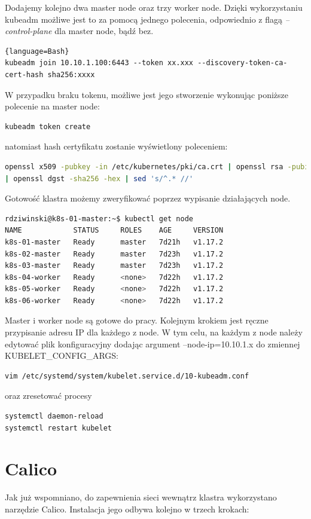 \documentclass[pl,final,oneside]{mgr} %
\begin{document}
Dodajemy kolejno dwa master node oraz trzy worker node. Dzięki wykorzystaniu kubeadm możliwe jest to za pomocą jednego polecenia, odpowiednio z flagą \textit{--control-plane} dla master node, bądź bez.
\begin{lstlisting}{language=Bash}
kubeadm join 10.10.1.100:6443 --token xx.xxx --discovery-token-ca-cert-hash sha256:xxxx
\end{lstlisting}
W przypadku braku tokenu, możliwe jest jego stworzenie wykonując poniższe polecenie na master node:
\begin{lstlisting}[language=Bash]
kubeadm token create
\end{lstlisting}
natomiast hash certyfikatu zostanie wyświetlony poleceniem:
\begin{lstlisting}[language=Bash]
openssl x509 -pubkey -in /etc/kubernetes/pki/ca.crt | openssl rsa -pubin -outform der 2>/dev/null \
| openssl dgst -sha256 -hex | sed 's/^.* //'
\end{lstlisting}

Gotowość klastra możemy zweryfikować poprzez wypisanie działających node.

\begin{lstlisting}[language=Bash]
rdziwinski@k8s-01-master:~$ kubectl get node
NAME            STATUS     ROLES    AGE     VERSION
k8s-01-master   Ready      master   7d21h   v1.17.2
k8s-02-master   Ready      master   7d23h   v1.17.2
k8s-03-master   Ready      master   7d23h   v1.17.2
k8s-04-worker   Ready      <none>   7d22h   v1.17.2
k8s-05-worker   Ready      <none>   7d22h   v1.17.2
k8s-06-worker   Ready      <none>   7d22h   v1.17.2

\end{lstlisting}


Master i worker node są gotowe do pracy. Kolejnym krokiem jest ręczne przypisanie adresu IP dla każdego z node. W tym celu, na każdym z node należy edytować plik konfiguracyjny dodając argument --node-ip=10.10.1.x do zmiennej KUBELET\_CONFIG\_ARGS:
\begin{lstlisting}[language=Bash]
vim /etc/systemd/system/kubelet.service.d/10-kubeadm.conf
\end{lstlisting}
oraz zresetować procesy
\begin{lstlisting}[language=Bash]
systemctl daemon-reload
systemctl restart kubelet
\end{lstlisting}

\section{Calico}
Jak już wspomniano, do zapewnienia sieci wewnątrz klastra wykorzystano narzędzie Calico. Instalacja jego odbywa kolejno w trzech krokach: 
\end{document}
